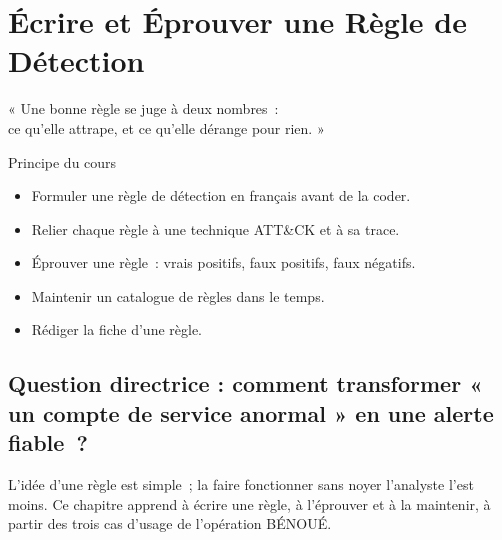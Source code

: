 
\chapter{Écrire et Éprouver une Règle de Détection}
\label{chap:regles}

\epigraph{%
    « Une bonne règle se juge à deux nombres~:\\
    ce qu'elle attrape, et ce qu'elle dérange pour rien. »%
}{Principe du cours}


\begin{boxobjectifs}
\begin{itemize}
    \item Formuler une règle de détection en français avant de la coder.
    \item Relier chaque règle à une technique ATT\&CK et à sa trace.
    \item Éprouver une règle~: vrais positifs, faux positifs, faux négatifs.
    \item Maintenir un catalogue de règles dans le temps.
    \item Rédiger la fiche d'une règle.
\end{itemize}
\end{boxobjectifs}

\bigskip

\section*{Question directrice : comment transformer « un compte de service anormal » en une alerte fiable~?}

L'idée d'une règle est simple~; la faire fonctionner sans noyer l'analyste
l'est moins. Ce chapitre apprend à écrire une règle, à l'éprouver et à la
maintenir, à partir des trois cas d'usage de l'opération BÉNOUÉ.

